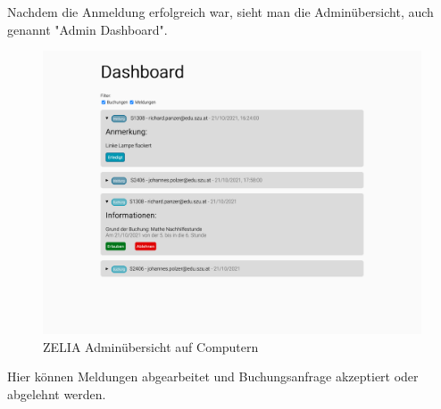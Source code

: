 Nachdem die Anmeldung erfolgreich war, sieht man die Adminübersicht, auch genannt "Admin Dashboard". 

\begin{figure}[H]
    \centering
    \includegraphics[width=120mm]{media/WebComponents/AdminSeite_light.png}
    \caption{ZELIA Adminübersicht auf Computern}
\end{figure}

Hier können Meldungen abgearbeitet und Buchungsanfrage akzeptiert oder abgelehnt werden.
